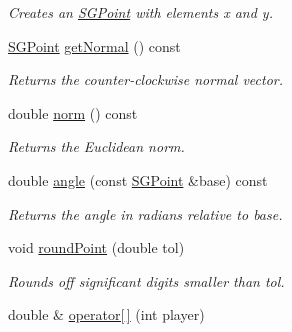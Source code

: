 \begin{DoxyCompactItemize}
\begin{DoxyCompactList}\small\item\em Creates an \hyperlink{class_s_g_point}{S\+G\+Point} with elements x and y. \end{DoxyCompactList}\item 
\hypertarget{class_s_g_point_a9afd46314dd53db086df54be5ebc0a56}{\hyperlink{class_s_g_point}{S\+G\+Point} \hyperlink{class_s_g_point_a9afd46314dd53db086df54be5ebc0a56}{get\+Normal} () const }\label{class_s_g_point_a9afd46314dd53db086df54be5ebc0a56}

\begin{DoxyCompactList}\small\item\em Returns the counter-\/clockwise normal vector. \end{DoxyCompactList}\item 
\hypertarget{class_s_g_point_a687f18f1e1eaa27ac14806d76c69b6c0}{double \hyperlink{class_s_g_point_a687f18f1e1eaa27ac14806d76c69b6c0}{norm} () const }\label{class_s_g_point_a687f18f1e1eaa27ac14806d76c69b6c0}

\begin{DoxyCompactList}\small\item\em Returns the Euclidean norm. \end{DoxyCompactList}\item 
\hypertarget{class_s_g_point_aa58461a5362b199cc0c6827f6e2c539c}{double \hyperlink{class_s_g_point_aa58461a5362b199cc0c6827f6e2c539c}{angle} (const \hyperlink{class_s_g_point}{S\+G\+Point} \&base) const }\label{class_s_g_point_aa58461a5362b199cc0c6827f6e2c539c}

\begin{DoxyCompactList}\small\item\em Returns the angle in radians relative to base. \end{DoxyCompactList}\item 
\hypertarget{class_s_g_point_a0eaedf1dcee422b6c31037e9fc5a42c0}{void \hyperlink{class_s_g_point_a0eaedf1dcee422b6c31037e9fc5a42c0}{round\+Point} (double tol)}\label{class_s_g_point_a0eaedf1dcee422b6c31037e9fc5a42c0}

\begin{DoxyCompactList}\small\item\em Rounds off significant digits smaller than tol. \end{DoxyCompactList}\item 
\hypertarget{class_s_g_point_a640f67ad5fa6d0b5814b7c9aecd259d3}{double \& \hyperlink{class_s_g_point_a640f67ad5fa6d0b5814b7c9aecd259d3}{operator\mbox{[}$\,$\mbox{]}} (int player)}\label{class_s_g_point_a640f67ad5fa6d0b5814b7c9aecd259d3}


\end{DoxyCompactItemize}
